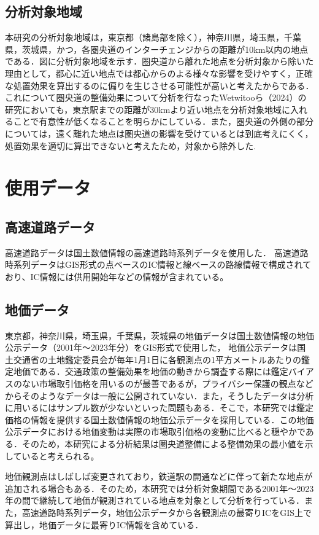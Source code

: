 \subsection{分析対象地域}
本研究の分析対象地域は，東京都（諸島部を除く），神奈川県，埼玉県，千葉県，茨城県，かつ，各圏央道のインターチェンジからの距離が10km以内の地点である．図に分析対象地域を示す．圏央道から離れた地点を分析対象から除いた理由として，都心に近い地点では都心からのよる様々な影響を受けやすく，正確な処置効果を算出するのに偏りを生じさせる可能性が高いと考えたからである．これについて圏央道の整備効果について分析を行なったWetwitooら（2024）\cite{Weteitoo2024}の研究においても，東京駅までの距離が30kmより近い地点を分析対象地域に入れることで有意性が低くなることを明らかにしている．また，圏央道の外側の部分については，遠く離れた地点は圏央道の影響を受けているとは到底考えにくく，処置効果を適切に算出できないと考えたため，対象から除外した.

\section{使用データ}

\subsection{高速道路データ}
高速道路データは国土数値情報の高速道路時系列データを使用した．
高速道路時系列データはGIS形式の点ベースのIC情報と線ベースの路線情報で構成されており、IC情報には供用開始年などの情報が含まれている。

\subsection{地価データ}
東京都，神奈川県，埼玉県，千葉県，茨城県の地価データは国土数値情報の地価公示データ（2001年〜2023年分）をGIS形式で使用した，
地価公示データは国土交通省の土地鑑定委員会が毎年1月1日に各観測点の1平方メートルあたりの鑑定地価である．交通政策の整備効果を地価の動きから調査する際には鑑定バイアスのない市場取引価格を用いるのが最善であるが，プライバシー保護の観点などからそのようなデータは一般に公開されていない．また，そうしたデータは分析に用いるにはサンプル数が少ないといった問題もある．そこで，本研究では鑑定価格の情報を提供する国土数値情報の地価公示データを採用している．\cite{shimizu2006}\cite{kunimi2021}この地価公示データにおける地価変動は実際の市場取引価格の変動に比べると穏やかである．そのため，本研究による分析結果は圏央道整備による整備効果の最小値を示していると考えられる。

地価観測点はしばしば変更されており，鉄道駅の開通などに伴って新たな地点が追加される場合もある．そのため，本研究では分析対象期間である2001年～2023年の間で継続して地価が観測されている地点を対象として分析を行っている．また，高速道路時系列データ，地価公示データから各観測点の最寄りICをGIS上で算出し，地価データに最寄りIC情報を含めている．

